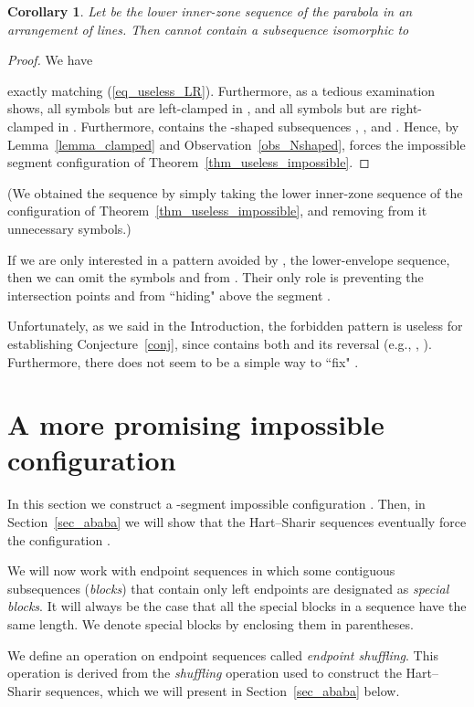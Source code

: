 \documentclass[11pt]{article}
\newtheorem{corollary}[theorem]{Corollary}
\theoremstyle{definition}
\theoremstyle{remark}
\begin{document}
\begin{corollary}\label{cor_useless_forbidden}
Let  be the lower inner-zone sequence of the parabola  in an arrangement of lines. Then  cannot contain a subsequence isomorphic to

\end{corollary}

\begin{proof}
We have

exactly matching (\ref{eq_useless_LR}). Furthermore, as a tedious examination shows, all symbols but  are left-clamped in , and all symbols but  are right-clamped in . Furthermore,
  contains the -shaped subsequences , , and . Hence, by Lemma~\ref{lemma_clamped} and Observation~\ref{obs_Nshaped},  forces the impossible segment configuration of Theorem~\ref{thm_useless_impossible}.
\end{proof}

(We obtained the sequence  by simply taking the lower inner-zone sequence of the configuration of Theorem~\ref{thm_useless_impossible}, and removing from it unnecessary symbols.)

If we are only interested in a pattern avoided by , the lower-envelope sequence, then we can omit the symbols  and  from . Their only role is preventing the intersection points  and  from ``hiding" above the segment .

Unfortunately, as we said in the Introduction, the forbidden pattern  is useless for establishing Conjecture~\ref{conj}, since  contains both  and its reversal (e.g., , ). Furthermore, there does not seem to be a simple way to ``fix" .

\section{A more promising impossible configuration}\label{sec_forbidden_2}

In this section we construct a -segment impossible configuration . Then, in Section~\ref{sec_ababa} we will show that the Hart--Sharir sequences eventually force the configuration .

We will now work with endpoint sequences in which some contiguous subsequences (\emph{blocks}) that contain only left endpoints are designated as \emph{special blocks}. It will always be the case that all the special blocks in a sequence have the same length. We denote special blocks by enclosing them in parentheses.

We define an operation on endpoint sequences called \emph{endpoint shuffling}. This operation is derived from the \emph{shuffling} operation used to construct the Hart--Sharir sequences, which we will present in Section~\ref{sec_ababa} below.
\end{document}
